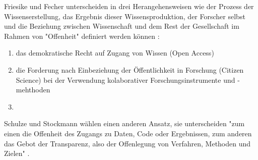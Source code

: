 Friesike und Fecher unterscheiden in drei Herangehensweisen wie der Prozess der Wissenserstellung, das Ergebnis dieser Wissensproduktion, der Forscher selbst und die Beziehung zwischen Wissenschaft und dem Rest der Gesellschaft im Rahmen von "Offenheit" definiert werden können \cite{cite:9}:
\begin{enumerate}
\item das demokratische Recht auf Zugang von Wissen (Open Access)
\item die Forderung nach Einbeziehung der Öffentlichkeit in Forschung (Citizen Science) bei der Verwendung kolaborativer Forschungsinstrumente und -mehthoden
\item 
\end{enumerate}

Schulze und Stockmann wählen einen anderen Ansatz, sie unterscheiden "zum einen die Offenheit des Zugangs zu Daten, Code oder Ergebnissen, zum anderen das Gebot der Transparenz, also der Offenlegung von Verfahren, Methoden und Zielen" \cite{schulze_2013_open}.

